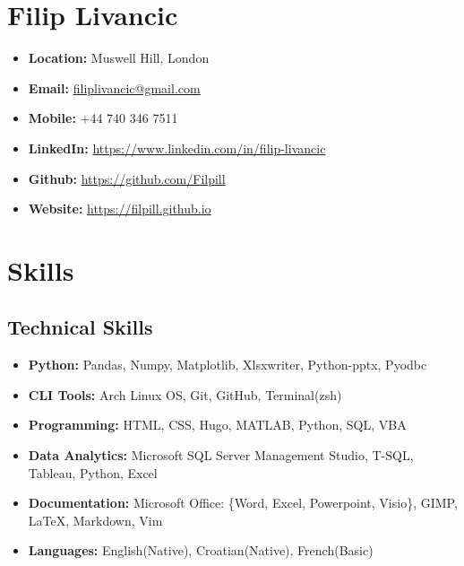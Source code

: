 \documentclass[a4paper,9pt]{article}
\date{}
\begin{document}
\section*{Filip Livancic}

\begin{itemize}[noitemsep]
    \item\textbf{Location: }Muswell Hill, London
    \item\textbf{Email: }\href{mailto:filiplivancic@gmail.com}{filiplivancic@gmail.com}
    \item\textbf{Mobile: }+44 740 346 7511
    \item\textbf{LinkedIn: }\url{https://www.linkedin.com/in/filip-livancic}
    \item\textbf{Github: }\url{https://github.com/Filpill}
    \item\textbf{Website: }\url{https://filpill.github.io}
\end{itemize}


\section*{Skills}
\subsection*{Technical Skills}
\begin{itemize}[noitemsep]
	\item \textbf{Python:} \hspace{14.8mm} Pandas, Numpy, Matplotlib, Xlsxwriter, Python-pptx, Pyodbc
	\item \textbf{CLI Tools:} \hspace{10mm} Arch Linux OS, Git, GitHub, Terminal(zsh)
	\item \textbf{Programming:} \hspace{3.3mm} HTML, CSS, Hugo, MATLAB, Python, SQL, VBA
	\item \textbf{Data Analytics:} \hspace{1mm} Microsoft SQL Server Management Studio, T-SQL, Tableau, Python, Excel
	\item \textbf{Documentation:} \hspace{0.5mm} Microsoft Office: \{Word, Excel, Powerpoint, Visio\}, GIMP, LaTeX, Markdown, Vim
	\item \textbf{Languages:} \hspace{9.3mm} English(Native), Croatian(Native), French(Basic)
\end{itemize}
\end{document}
